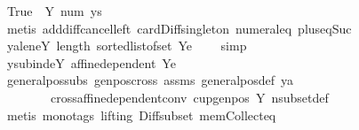 \begin{isabellebody}
\ True\ {}{}\ Y{\isacharparenleft}{\kern0pt}{}{\isacharparenright}{\kern0pt}\ num{\isacharunderscore}{\kern0pt}{}\ ys\isanewline
\ \ \ \ \ \ \isamarkupfalse%
\ {\isacharparenleft}{\kern0pt}metis\ add{\isacharunderscore}{\kern0pt}diff{\isacharunderscore}{\kern0pt}cancel{\isacharunderscore}{\kern0pt}left{\isacharprime}{\kern0pt}\ card{\isacharunderscore}{\kern0pt}Diff{\isacharunderscore}{\kern0pt}singleton\ numeral{\isacharunderscore}{\kern0pt}{}{\isacharunderscore}{\kern0pt}eq{\isacharunderscore}{\kern0pt}{}\ plus{\isacharunderscore}{\kern0pt}{}{\isacharunderscore}{\kern0pt}eq{\isacharunderscore}{\kern0pt}Suc{\isacharparenright}{\kern0pt}\isanewline
\ \ \ \ \isamarkupfalse%
\ y{\isacharunderscore}{\kern0pt}a{\isacharunderscore}{\kern0pt}len{\isacharcolon}{\kern0pt}{\isachardoublequoteopen}{\isasymforall}e{\isasymin}Y{\isachardot}{\kern0pt}\ length\ {\isacharparenleft}{\kern0pt}sorted{\isacharunderscore}{\kern0pt}list{\isacharunderscore}{\kern0pt}of{\isacharunderscore}{\kern0pt}set\ {\isacharparenleft}{\kern0pt}Y{\isacharminus}{\kern0pt}{\isacharbraceleft}{\kern0pt}e{\isacharbraceright}{\kern0pt}{\isacharparenright}{\kern0pt}{\isacharparenright}{\kern0pt}\ {\isacharequal}{\kern0pt}\ {}{\isachardoublequoteclose}\ \isamarkupfalse%
\ simp\isanewline
\ \ \ \ \isamarkupfalse%
\ y{\isacharunderscore}{\kern0pt}sub{\isacharunderscore}{\kern0pt}ind{\isacharcolon}{\kern0pt}{\isachardoublequoteopen}{\isasymforall}e{\isasymin}Y{\isachardot}{\kern0pt}\ {\isasymnot}affine{\isacharunderscore}{\kern0pt}dependent\ {\isacharparenleft}{\kern0pt}Y{\isacharminus}{\kern0pt}{\isacharbraceleft}{\kern0pt}e{\isacharbraceright}{\kern0pt}{\isacharparenright}{\kern0pt}{\isachardoublequoteclose}\ \isanewline
\ \ \ \ \ \ \isamarkupfalse%
\ general{\isacharunderscore}{\kern0pt}pos{\isacharunderscore}{\kern0pt}subs\ genpos{\isacharunderscore}{\kern0pt}cross{}\ assms\ general{\isacharunderscore}{\kern0pt}pos{\isacharunderscore}{\kern0pt}def\ y{\isacharunderscore}{\kern0pt}a\isanewline
\ \ \ \ \ \ \ \ cross{\isacharunderscore}{\kern0pt}affine{\isacharunderscore}{\kern0pt}dependent{\isacharunderscore}{\kern0pt}conv\ cup{\isacharunderscore}{\kern0pt}genpos\ Y{\isacharparenleft}{\kern0pt}{}{\isacharparenright}{\kern0pt}\ nsubset{\isacharunderscore}{\kern0pt}def\isanewline
\ \ \ \ \ \ \isamarkupfalse%
\ {\isacharparenleft}{\kern0pt}metis\ {\isacharparenleft}{\kern0pt}mono{\isacharunderscore}{\kern0pt}tags{\isacharcomma}{\kern0pt}\ lifting{\isacharparenright}{\kern0pt}\ Diff{\isacharunderscore}{\kern0pt}subset\ mem{\isacharunderscore}{\kern0pt}Collect{\isacharunderscore}{\kern0pt}eq{\isacharparenright}{\kern0pt}\isanewline

\end{isabellebody}
